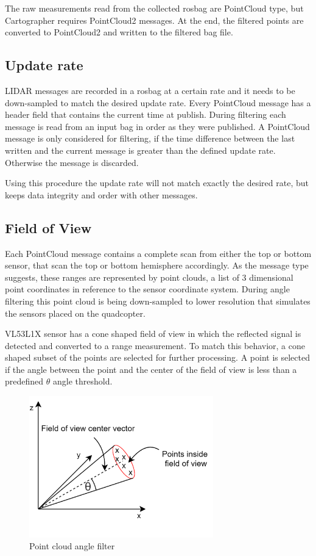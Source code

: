 The raw measurements read from the collected rosbag are PointCloud type, but Cartographer requires 
PointCloud2 messages. At the end, the filtered points are converted to PointCloud2 and written
to the filtered bag file. 

\subsection{Update rate}
LIDAR messages are recorded in a rosbag at a certain rate and it needs to be down-sampled to match
the desired update rate. Every PointCloud message has a header field that contains the current time
at publish. During filtering each message is read from an input bag in order as they were published.
A PointCloud message is only considered for filtering, if the time difference between the last written 
and the current message is greater than the defined update rate. Otherwise the message is discarded.

Using this procedure the update rate will not match exactly the desired rate, but keeps data integrity
and order with other messages. 



\subsection{Field of View}
Each PointCloud message contains a complete scan from either the top or bottom sensor, that scan the 
top or bottom hemisphere accordingly. As the message type suggests, these ranges are represented by 
point clouds, a list of 3 dimensional point coordinates in reference to the sensor coordinate system. During 
angle filtering this point cloud is being down-sampled to lower resolution that simulates the sensors
placed on the quadcopter.

VL53L1X sensor has a cone shaped field of view in which the reflected signal is detected and converted to
a range measurement. To match this behavior, a cone shaped subset of the points are selected for further
processing. A point is selected if the angle between the point and the center of the field of view is less
than a predefined $\theta$ angle threshold.

\begin{figure}[!ht]
    \centering
    \includegraphics[width=80mm, keepaspectratio]{figures/data_angle_filter.png}
    \caption{Point cloud angle filter}
    \label{fig:data_angle_filter}
\end{figure}


